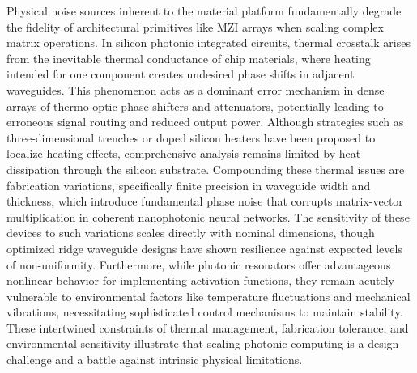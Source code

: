 \documentclass[11pt]{article}
\begin{document}
Physical noise sources inherent to the material platform fundamentally degrade the fidelity of architectural primitives like MZI arrays when scaling complex matrix operations. In silicon photonic integrated circuits, thermal crosstalk arises from the inevitable thermal conductance of chip materials, where heating intended for one component creates undesired phase shifts in adjacent waveguides. \citep{doi_10_1109_access_2020_3013116_8fec1fb2} This phenomenon acts as a dominant error mechanism in dense arrays of thermo-optic phase shifters and attenuators, potentially leading to erroneous signal routing and reduced output power. Although strategies such as three-dimensional trenches or doped silicon heaters have been proposed to localize heating effects, comprehensive analysis remains limited by heat dissipation through the silicon substrate. Compounding these thermal issues are fabrication variations, specifically finite precision in waveguide width and thickness, which introduce fundamental phase noise that corrupts matrix-vector multiplication in coherent nanophotonic neural networks. \citep{doi_10_1109_tnano_2022_3223915_d4da3e6b} The sensitivity of these devices to such variations scales directly with nominal dimensions, though optimized ridge waveguide designs have shown resilience against expected levels of non-uniformity. Furthermore, while photonic resonators offer advantageous nonlinear behavior for implementing activation functions, they remain acutely vulnerable to environmental factors like temperature fluctuations and mechanical vibrations, necessitating sophisticated control mechanisms to maintain stability. These intertwined constraints of thermal management, fabrication tolerance, and environmental sensitivity illustrate that scaling photonic computing is a design challenge and a battle against intrinsic physical limitations. \citep{doi_10_1109_access_2020_3013116_8fec1fb2} \citep{doi_10_1109_tnano_2022_3223915_d4da3e6b} \citep{doi_10_3390_nano14080697_c372a140}
\end{document}
